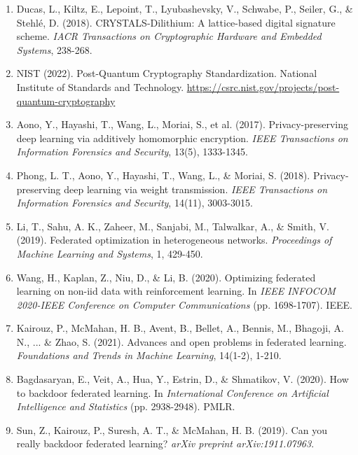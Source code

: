 \documentclass[12pt,a4paper]{article}
\begin{document}
\begin{enumerate}
    \item Ducas, L., Kiltz, E., Lepoint, T., Lyubashevsky, V., Schwabe, P., Seiler, G., \& Stehlé, D. (2018). CRYSTALS-Dilithium: A lattice-based digital signature scheme. \textit{IACR Transactions on Cryptographic Hardware and Embedded Systems}, 238-268.
    
    \item NIST (2022). Post-Quantum Cryptography Standardization. National Institute of Standards and Technology. \url{https://csrc.nist.gov/projects/post-quantum-cryptography}
    
    \item Aono, Y., Hayashi, T., Wang, L., Moriai, S., et al. (2017). Privacy-preserving deep learning via additively homomorphic encryption. \textit{IEEE Transactions on Information Forensics and Security}, 13(5), 1333-1345.
    
    \item Phong, L. T., Aono, Y., Hayashi, T., Wang, L., \& Moriai, S. (2018). Privacy-preserving deep learning via weight transmission. \textit{IEEE Transactions on Information Forensics and Security}, 14(11), 3003-3015.
    
    \item Li, T., Sahu, A. K., Zaheer, M., Sanjabi, M., Talwalkar, A., \& Smith, V. (2019). Federated optimization in heterogeneous networks. \textit{Proceedings of Machine Learning and Systems}, 1, 429-450.
    
    \item Wang, H., Kaplan, Z., Niu, D., \& Li, B. (2020). Optimizing federated learning on non-iid data with reinforcement learning. In \textit{IEEE INFOCOM 2020-IEEE Conference on Computer Communications} (pp. 1698-1707). IEEE.
    
    \item Kairouz, P., McMahan, H. B., Avent, B., Bellet, A., Bennis, M., Bhagoji, A. N., ... \& Zhao, S. (2021). Advances and open problems in federated learning. \textit{Foundations and Trends in Machine Learning}, 14(1-2), 1-210.
    
    \item Bagdasaryan, E., Veit, A., Hua, Y., Estrin, D., \& Shmatikov, V. (2020). How to backdoor federated learning. In \textit{International Conference on Artificial Intelligence and Statistics} (pp. 2938-2948). PMLR.
    
    \item Sun, Z., Kairouz, P., Suresh, A. T., \& McMahan, H. B. (2019). Can you really backdoor federated learning? \textit{arXiv preprint arXiv:1911.07963}.
    

\end{enumerate}
\end{document}
